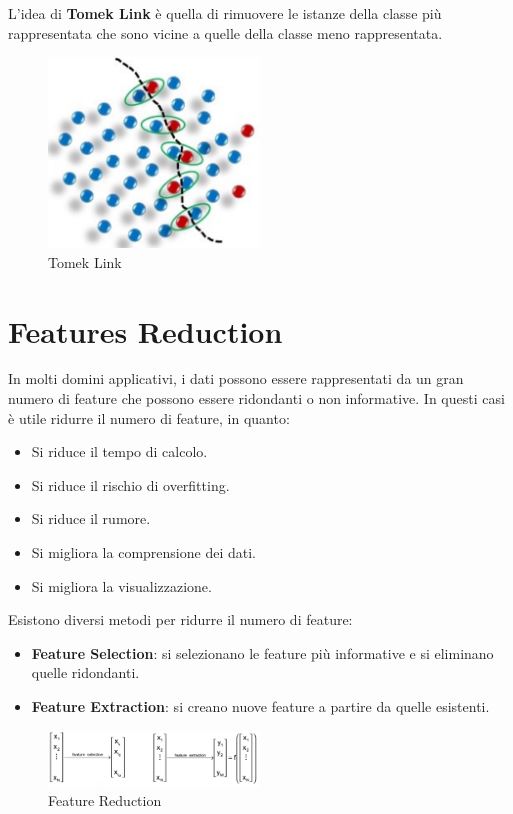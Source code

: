 L'idea di \textbf{Tomek Link} è quella di rimuovere le istanze della classe più
rappresentata che sono vicine a quelle della classe meno rappresentata.
\begin{figure}[!ht]
      \centering
      \includegraphics[width=0.5\textwidth]{./img/Preprocessing/tomek.png}
      \caption{Tomek Link}
      \label{fig:tomeklink}
\end{figure}
\section{Features Reduction}
In molti domini applicativi, i dati possono essere rappresentati da un gran
numero di feature che possono essere ridondanti o non informative. In questi casi
è utile ridurre il numero di feature, in quanto:
\begin{itemize}
      \item Si riduce il tempo di calcolo.
      \item Si riduce il rischio di overfitting.
      \item Si riduce il rumore.
      \item Si migliora la comprensione dei dati.
      \item Si migliora la visualizzazione.
\end{itemize}
Esistono diversi metodi per ridurre il numero di feature:
\begin{itemize}
      \item \textbf{Feature Selection}: si selezionano le feature più informative
            e si eliminano quelle ridondanti.
      \item \textbf{Feature Extraction}: si creano nuove feature a partire da
            quelle esistenti.
\end{itemize}
\begin{figure}
      \centering
      \includegraphics[width=0.5\textwidth]{./img/Preprocessing/features.png}
      \caption{Feature Reduction}
      \label{fig:feature_reduction}
\end{figure}
